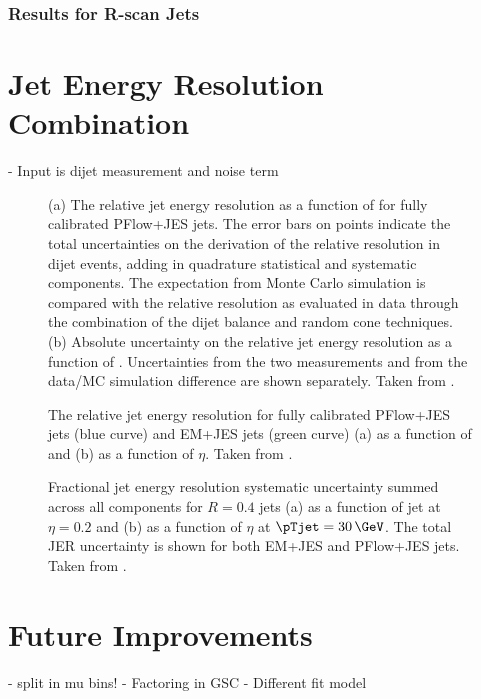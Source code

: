 \subsubsection{Results for R-scan Jets}


\section{Jet Energy Resolution Combination}

- Input is dijet measurement and noise term

\begin{figure}
    \caption{(a) The relative jet energy resolution as a function of \pT for fully calibrated PFlow+JES jets. The error bars on points indicate the total uncertainties on the derivation of the relative resolution in dijet events, adding in quadrature statistical and systematic components. The expectation from Monte Carlo simulation is compared with the relative resolution as evaluated in data through the combination of the dijet balance and random cone techniques. (b) Absolute uncertainty on the relative jet energy resolution as a function of \pTjet. Uncertainties from the two \insitu measurements and from the data/MC simulation difference are shown separately. Taken from .}
    \label{fig:jer-combination-incl-noise-term}
\end{figure}



\begin{figure}
    \caption{The relative jet energy resolution for fully calibrated PFlow+JES jets (blue curve) and EM+JES jets (green curve) (a) as a function of \pTjet and (b) as a function of $\eta$. Taken from .}
    \label{fig:jer-combination-results}
\end{figure}

\begin{figure}
    \caption{Fractional jet energy resolution systematic uncertainty summed across all components for \antikt $R = 0.4$ jets (a) as a function of jet \pTjet at $\eta = 0.2$ and (b) as a function of $\eta$ at $\pTjet = 30\,\GeV$. The total JER uncertainty is shown for both EM+JES and PFlow+JES jets. Taken from .}
    \label{fig:jer-combination-uncertainties}
\end{figure}



\section{Future Improvements}

- split in mu bins!
- Factoring in GSC
- Different fit model